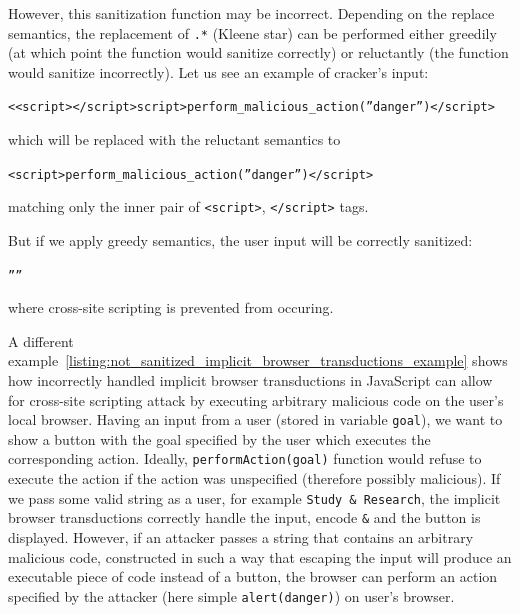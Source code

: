 However, this sanitization function may be incorrect.
Depending on the replace semantics, the replacement of \texttt{.*} (Kleene star) can be performed either greedily (at which point the function would sanitize correctly) or reluctantly (the function would sanitize incorrectly).
Let us see an example of cracker's input:
\begin{center}
 \texttt{<<script></script>script>perform\_malicious\_action(''danger'')</script>}
\end{center}
which will be replaced with the reluctant semantics to
\begin{center}
 \texttt{<script>perform\_malicious\_action(''danger'')</script>}
\end{center}

matching only the inner pair of \texttt{<script>}, \texttt{</script>} tags.

But if we apply greedy semantics, the user input will be correctly sanitized:
\begin{center}
 \texttt{''''}
\end{center}
where cross-site scripting is prevented from occuring.

A different example~\ref{listing:not_sanitized_implicit_browser_transductions_example} shows how incorrectly handled implicit browser transductions in JavaScript can allow for cross-site scripting attack by executing arbitrary malicious code on the user's local browser.
Having an input from a user (stored in variable \texttt{goal}), we want to show a button with the goal specified by the user which executes the corresponding action. Ideally, \texttt{performAction(goal)} function would refuse to execute the action if the action was unspecified (therefore possibly malicious).
If we pass some valid string as a user, for example \texttt{Study \& Research}, the implicit browser transductions correctly handle the input, encode \texttt{\&} and the button is displayed.
However, if an attacker passes a string that contains an arbitrary malicious code, constructed in such a way that escaping the input will produce an executable piece of code instead of a button, the browser can perform an action specified by the attacker (here simple \texttt{alert(danger)}) on user's browser.

